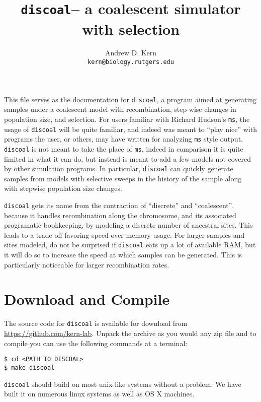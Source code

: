 \documentclass[12pt]{article}
\begin{document}
%
\title{\textbf{\texttt{discoal}}-- a coalescent simulator with selection}
\author{Andrew D. Kern \\
\texttt{kern@biology.rutgers.edu}\\
}


\maketitle

This file serves as the documentation for \texttt{discoal}, a program aimed at generating samples 
under a coalescent model with recombination, step-wise changes in population size, and selection. 
For users familiar with Richard Hudson's \texttt{ms}, the usage of \texttt{discoal} will be quite
familiar, and indeed was meant to ``play nice'' with programs the user, or others, may have written 
for analyzing \texttt{ms} style output. \texttt{discoal} is not meant to take the place of \texttt{ms},
indeed in comparison it is quite limited in what it can do, but instead is meant to add a few models
not covered by other simulation programs. In particular, \texttt{discoal} can quickly generate samples 
from models with selective sweeps in the history of the sample along with stepwise population size
changes. 

\texttt{discoal} gets its name from the contraction of ``discrete'' and ``coalescent'', because it 
handles recombination along the chromosome, and its associated programatic bookkeeping, by modeling 
a discrete number of ancestral sites. This leads to a trade off favoring speed over memory usage. For larger samples
and sites modeled, do not be surprised if \texttt{discoal} eats up a lot of available RAM, but it will
do so to increase the speed at which samples can be generated. This is particularly noticeable for larger 
recombination rates.  

\section*{Download and Compile}
The source code for \texttt{discoal} is available for download from \url{https://github.com/kern-lab}. Unpack the archive as you would any zip file and to compile you can use the following commands at a terminal:

\begin{verbatim}
$ cd <PATH TO DISCOAL>
$ make discoal
\end{verbatim}

\texttt{discoal} should build on most unix-like systems without a problem. We have built it on numerous linux systems as
well as OS X machines.  
\end{document}
